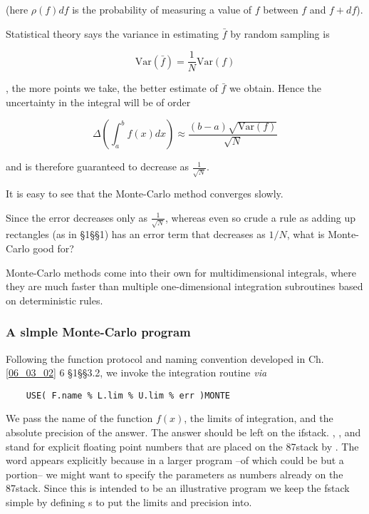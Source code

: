(here $\rho(f)df$ is the probability of measuring a value of $f$ between $f$ and $f + df$).

Statistical theory says the variance in estimating $\bar{f}$ by random sampling is

\begin{equation}
\text{Var}(\bar{f}) = \frac{1}{N} \text{Var}(f)
\end{equation}

\ie, the more points we take, the better estimate of $\bar{f}$ we obtain. Hence the uncertainty in the integral will be of order

\begin{equation}
\Delta \left(\int_{a}^{b}f(x)dx\right) \approx \frac{(b-a)\sqrt{\text{Var}(f)}}{\sqrt{N}}
\end{equation}

and is therefore guaranteed to decrease as $\frac{1}{\sqrt{N}}$.

It is easy to see that the Monte-Carlo method converges slowly.

Since the error decreases only as $\frac{1}{\sqrt{N}}$, whereas even so crude a rule as adding up rectangles (as in \S1\S\S1) has an error term that decreases as $1/N$, what is Monte-Carlo good for?

Monte-Carlo methods come into their own for multidimensional integrals, where they are much faster than multiple one-dimensional integration subroutines based on deterministic rules.

\subsubsection{A slmple Monte-Carlo program}\label{chap:08_01_03_02}
Following the function protocol and naming convention developed in Ch. \ref{06_03_02} 6 \S1\S\S3.2, we invoke the integration routine \textit{via}

\begin{lstlisting}
    USE( F.name % L.lim % U.lim % err )MONTE
\end{lstlisting}

We pass  the name  of the function $f(x)$, the limits of integration, and the absolute precision of the answer. The answer should be left on the ifstack. , , and  stand for explicit ﬂoating point numbers that are placed on the 87stack by \bc{\%}. The word \bc{\%} appears explicitly because in a larger program --of which  could be but a portion-- we might want to specify the parameters as numbers already on the 87stack. Since this is intended to be an illustrative program we keep the fstack simple by defining s to put the limits and precision into.

